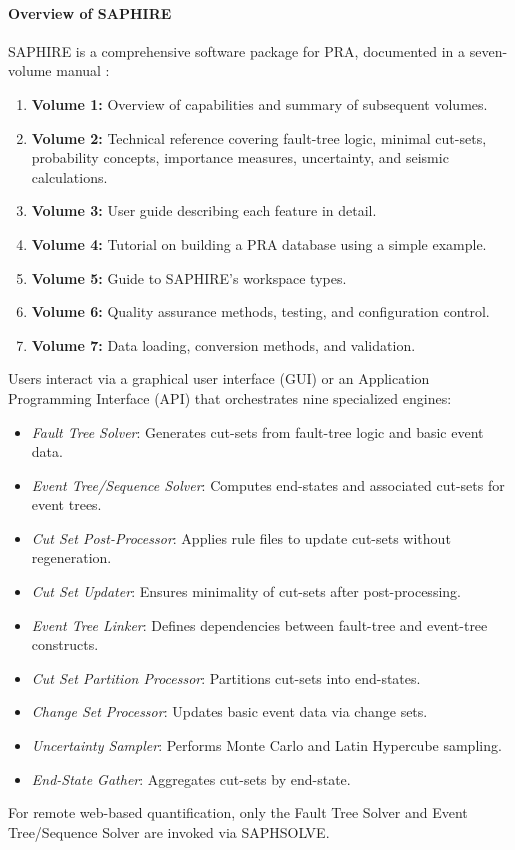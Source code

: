 \paragraph{Overview of SAPHIRE}
SAPHIRE is a comprehensive software package for PRA, documented in a seven-volume manual \cite{24}:
\begin{enumerate}
  \item \textbf{Volume 1:} Overview of capabilities and summary of subsequent volumes.
  \item \textbf{Volume 2:} Technical reference covering fault-tree logic, minimal cut-sets, probability concepts, importance measures, uncertainty, and seismic calculations.
  \item \textbf{Volume 3:} User guide describing each feature in detail.
  \item \textbf{Volume 4:} Tutorial on building a PRA database using a simple example.
  \item \textbf{Volume 5:} Guide to SAPHIRE's workspace types.
  \item \textbf{Volume 6:} Quality assurance methods, testing, and configuration control.
  \item \textbf{Volume 7:} Data loading, conversion methods, and validation.
\end{enumerate}
Users interact via a graphical user interface (GUI) or an Application Programming Interface (API) that orchestrates nine specialized engines:
\begin{itemize}
  \item \emph{Fault Tree Solver}: Generates cut-sets from fault-tree logic and basic event data.
  \item \emph{Event Tree/Sequence Solver}: Computes end-states and associated cut-sets for event trees.
  \item \emph{Cut Set Post-Processor}: Applies rule files to update cut-sets without regeneration.
  \item \emph{Cut Set Updater}: Ensures minimality of cut-sets after post-processing.
  \item \emph{Event Tree Linker}: Defines dependencies between fault-tree and event-tree constructs.
  \item \emph{Cut Set Partition Processor}: Partitions cut-sets into end-states.
  \item \emph{Change Set Processor}: Updates basic event data via change sets.
  \item \emph{Uncertainty Sampler}: Performs Monte Carlo and Latin Hypercube sampling.
  \item \emph{End-State Gather}: Aggregates cut-sets by end-state.
\end{itemize}
For remote web-based quantification, only the Fault Tree Solver and Event Tree/Sequence Solver are invoked via SAPHSOLVE.

